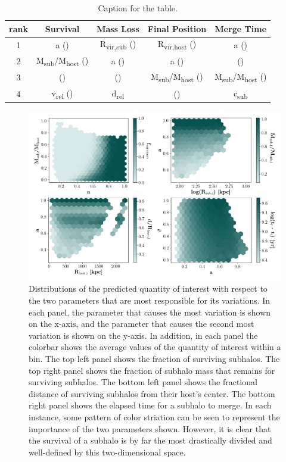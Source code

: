 \documentclass[fleqn,usenatbib]{mnras}
\begin{document}
\begin{table}
	\centering
	\caption{Caption for the table.}
	\label{tab:FS_table}
	\begin{tabular}{c|cccc} %
		\hline
		rank & Survival & Mass Loss & Final Position & Merge Time\\
		\hline
		1 & a () & R\textsubscript{vir,sub} () & R\textsubscript{vir,host} () & a ()\\
		2 & M\textsubscript{sub}/M\textsubscript{host} () & a () & a () & \textepsilon ()\\
		3 & \textepsilon () & \textepsilon () & M\textsubscript{sub}/M\textsubscript{host} () & M\textsubscript{sub}/M\textsubscript{host} ()\\
		4 & v\textsubscript{rel} () & d\textsubscript{rel} & \textepsilon () & c\textsubscript{sub}\\
		\hline
	\end{tabular}
\end{table}

\begin{figure}[h]
	\includegraphics[width=\textwidth]{Figures/bestSpaces}
    \caption{Distributions of the predicted quantity of interest with respect to the two parameters that are most responsible for its variations. In each panel, the parameter that causes the most variation is shown on the x-axis, and the parameter that causes the second most variation is shown on the y-axis. In addition, in each panel the colorbar shows the average values of the quantity of interest within a bin. The top left panel shows the fraction of surviving subhalos. The top right panel shows the fraction of subhalo mass that remains for surviving subhalos. The bottom left panel shows the fractional distance of surviving subhalos from their host's center. The bottom right panel shows the elapsed time for a subhalo to merge. In each instance, some pattern of color striation can be seen to represent the importance of the two parameters shown. However, it is clear that the survival of a subhalo is by far the most drastically divided and well-defined by this two-dimensional space. }
    \label{fig:bestSpaces}
\end{figure}
\end{document}
